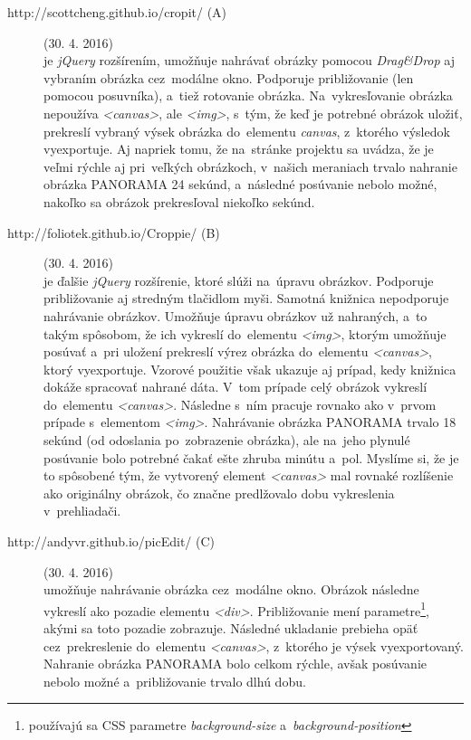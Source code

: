 \begin{description}
	
	\item[http://scottcheng.github.io/cropit/ (A)] (30. 4. 2016)\\
	je \emph{jQuery} rozšírením, umožňuje nahrávať obrázky pomocou \emph{Drag\&Drop} aj vybraním obrázka cez~modálne okno. Podporuje približovanie (len pomocou posuvníka), a~tiež rotovanie obrázka. Na~vykresľovanie obrázka nepoužíva \emph{<canvas>}, ale \emph{<img>}, s~tým, že keď je potrebné obrázok uložiť, prekreslí vybraný výsek obrázka do~elementu \emph{canvas}, z~ktorého výsledok vyexportuje. Aj napriek tomu, že na~stránke projektu sa uvádza, že je veľmi rýchle aj pri~veľkých obrázkoch, v~našich meraniach trvalo nahranie obrázka PANORAMA 24 sekúnd, a~následné posúvanie nebolo možné, nakoľko sa obrázok prekresľoval niekoľko sekúnd.
	
	
	\item[http://foliotek.github.io/Croppie/ (B)] (30. 4. 2016)\\
	je ďalšie \emph{jQuery} rozšírenie, ktoré slúži na~úpravu obrázkov. Podporuje približovanie aj stredným tlačidlom myši. Samotná knižnica nepodporuje nahrávanie obrázkov. Umožňuje úpravu obrázkov už nahraných, a~to takým spôsobom, že ich vykreslí do~elementu \emph{<img>}, ktorým umožňuje posúvať a~pri uložení prekreslí výrez obrázka do~elementu \emph{<canvas>}, ktorý vyexportuje. Vzorové použitie však ukazuje aj prípad, kedy knižnica dokáže spracovať nahrané dáta. V~tom prípade celý obrázok vykreslí do~elementu \emph{<canvas>}. Následne s~ním pracuje rovnako ako v~prvom prípade s~elementom \emph{<img>}. Nahrávanie obrázka PANORAMA trvalo 18 sekúnd (od odoslania po~zobrazenie obrázka), ale na~jeho plynulé posúvanie bolo potrebné čakať ešte zhruba minútu a~pol. Myslíme si, že je to spôsobené tým, že vytvorený element \emph{<canvas>} mal rovnaké rozlíšenie ako originálny obrázok, čo značne predlžovalo dobu vykreslenia v~prehliadači.
	
	
	\item[http://andyvr.github.io/picEdit/ (C)] (30. 4. 2016)\\
	umožňuje nahrávanie obrázka cez~modálne okno. Obrázok následne vykreslí ako pozadie elementu \emph{<div>}. Približovanie mení parametre\footnote{používajú sa CSS parametre \emph{background-size} a~\emph{background-position}}, akými sa toto pozadie zobrazuje. Následné ukladanie prebieha opäť cez~prekreslenie do~elementu \emph{<canvas>}, z~ktorého je výsek vyexportovaný. Nahranie obrázka PANORAMA bolo celkom rýchle, avšak posúvanie nebolo možné a~približovanie trvalo dlhú dobu.
	

\end{description}
